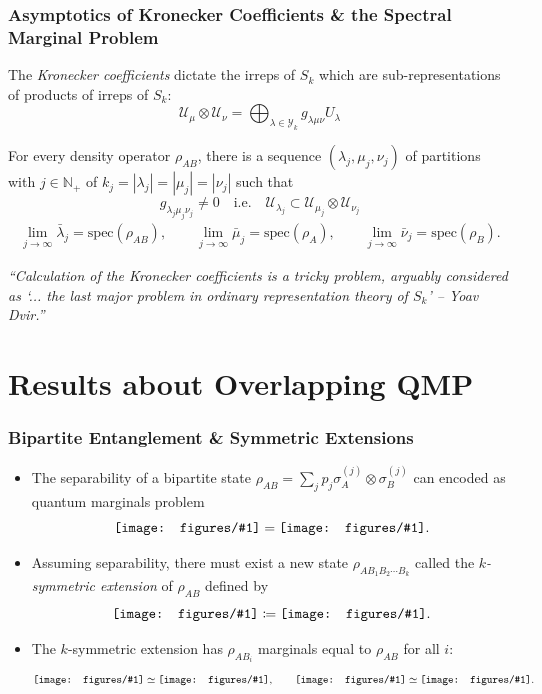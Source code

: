 \documentclass[
    9pt,
    hyperref={bookmarks=false, colorlinks=false}, %
    xcolor={dvipsnames},
]{beamer}
\newcommand{\incstr}[1]{\vcenter{\hbox{\texttt{[image: figures/\#1]}}}} %
\begin{document}
\begin{frame}
    \frametitle{Asymptotics of Kronecker Coefficients \& the Spectral Marginal Problem}
    \begin{definition}
        The \textit{Kronecker coefficients} dictate the irreps of $S_k$ which are sub-representations of products of irreps of $S_k$:
        \[ \mathcal U_{\mu} \otimes \mathcal U_{\nu}  = {\bigoplus}_{\lambda \in \mathcal Y_k} g_{\lambda \mu \nu} U_{\lambda} \]
    \end{definition}
    \begin{theorem}
        For every density operator $\rho_{AB}$, there is a sequence $(\lambda_j, \mu_j, \nu_j)$ of partitions with $j \in \mathbb N_+$ of $k_j = |\lambda_j| = |\mu_j| = |\nu_j|$ such that 
        \[ g_{\lambda_j \mu_j \nu_j} \neq 0 \quad \text{i.e.} \quad \mathcal U_{\lambda_j} \subset \mathcal U_{\mu_j} \otimes \mathcal U_{\nu_j} \]
        \begin{align*}
            \lim_{j\to \infty} \bar \lambda_j = \mathrm{spec}(\rho_{AB}), \qquad 
            \lim_{j\to \infty} \bar \mu_j = \mathrm{spec}(\rho_{A}), \qquad
            \lim_{j\to \infty} \bar \nu_j = \mathrm{spec}(\rho_{B}).
        \end{align*}
    \end{theorem}
    \begin{alertblock}{}
        \textit{``Calculation of the Kronecker coefficients is a tricky problem, arguably considered as `... the last major problem in ordinary representation theory of $S_k$' -- Yoav Dvir.''}
        \hspace*{}
    \end{alertblock}
\end{frame}

\section{Results about Overlapping QMP}
\begin{frame}
    \frametitle{Bipartite Entanglement \& Symmetric Extensions}
    \begin{itemize}
        \item The separability of a bipartite state $\rho_{AB} = {\sum}_{j} p_j \sigma_A^{(j)}\otimes \sigma_B^{(j)}$ can encoded as quantum marginals problem
            \[ \incstr{bipartite.pdf} = \incstr{sep_class_wire.pdf} .\]
        \item Assuming separability, there must exist a new state $\rho_{AB_1B_2\cdots B_k}$ called the \textit{$k$-symmetric extension} of $\rho_{AB}$ defined by
            \[ \incstr{kpartite.pdf} \coloneqq \incstr{sep_ext_k.pdf}. \]
        \item The $k$-symmetric extension has $\rho_{AB_i}$ marginals equal to $\rho_{AB}$ for all $i$:
            \[ \incstr{bipartite.pdf} \simeq \incstr{kpartite_marg.pdf}, \qquad \incstr{kpartite.pdf} \simeq \incstr{kpartite_sym.pdf}. \]
    \end{itemize}
\end{frame}
\end{document}
